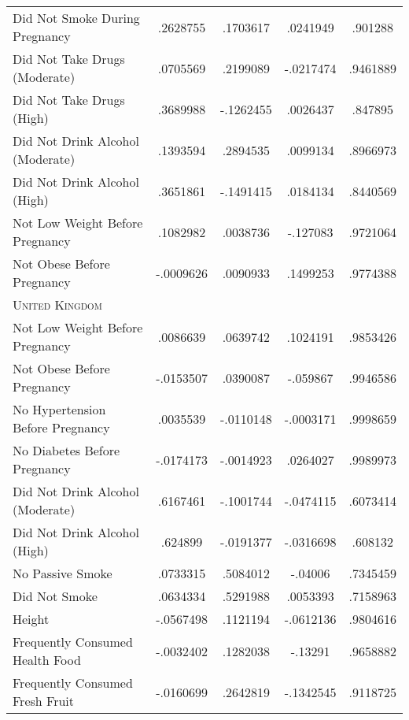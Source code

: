 \documentclass{nature}
\begin{document}
\begin{linenumbers}
\begin{spacing}{1}
\begin{table}
\begin{center}
\begin{tabular}{lcccc}
      Did Not Smoke During Pregnancy      &    .2628755&    .1703617&    .0241949&     .901288\\
      Did Not Take Drugs (Moderate) &    .0705569&    .2199089&   -.0217474&    .9461889\\
      Did Not Take Drugs (High)  &    .3689988&   -.1262455&    .0026437&     .847895\\
      Did Not Drink Alcohol (Moderate) &    .1393594&    .2894535&    .0099134&    .8966973\\
      Did Not Drink Alcohol (High) &    .3651861&   -.1491415&    .0184134&    .8440569\\
      Not Low Weight Before Pregnancy    &    .1082982&    .0038736&    -.127083&    .9721064\\
      Not Obese Before Pregnancy        &   -.0009626&    .0090933&    .1499253&    .9774388\\
      \midrule
      \textsc{United Kingdom} &&&\\
      Not Low Weight Before Pregnancy     &    .0086639&    .0639742&    .1024191&    .9853426\\
      Not Obese Before Pregnancy           &   -.0153507&    .0390087&    -.059867&    .9946586\\
      No Hypertension Before Pregnancy    &    .0035539&   -.0110148&   -.0003171&    .9998659\\
      No Diabetes Before Pregnancy    &   -.0174173&   -.0014923&    .0264027&    .9989973\\
      Did Not Drink Alcohol (Moderate)  &    .6167461&   -.1001744&   -.0474115&    .6073414\\
      Did Not Drink Alcohol (High) &     .624899&   -.0191377&   -.0316698&     .608132\\
      No Passive Smoke &    .0733315&    .5084012&     -.04006&    .7345459\\
      Did Not Smoke  &    .0634334&    .5291988&    .0053393&    .7158963\\
      Height              &   -.0567498&    .1121194&   -.0612136&    .9804616\\
      Frequently Consumed Health Food  &   -.0032402&    .1282038&     -.13291&    .9658882\\
      Frequently Consumed Fresh Fruit  &   -.0160699&    .2642819&   -.1342545&    .9118725\\
      

      \bottomrule
      

    \end{tabular}
  \end{center}
\end{table}



\end{spacing}
\end{linenumbers}
\end{document}
